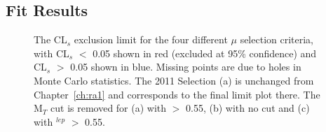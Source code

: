 \subsection{Fit Results}


\begin{figure}[htbp]
\centering
{}
\caption{\label{fig:4fit}The CL$_{s}$ exclusion limit for the four different $\mu$ selection criteria, with CL$_{s}$ $<$ 0.05 shown in red (excluded at 95\% confidence) and CL$_{s}$ $>$ 0.05 shown in blue. Missing points are due to holes in Monte Carlo statistics. The 2011 Selection (a) is unchanged from Chapter~\ref{ch:ra1} and corresponds to the final limit plot there. The M$_{T}$ cut is removed for (a) with \alt $>$ 0.55, (b) with no \alt cut and (c) with \alt$^{lep}$ $>$ 0.55.}
\end{figure}









